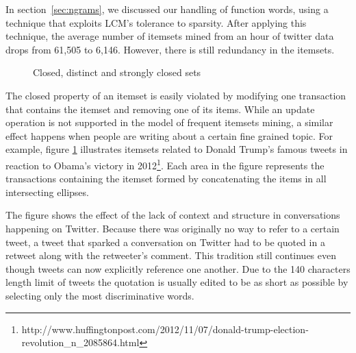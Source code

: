 \documentclass[letterpaper,12pt,titlepage,oneside,final]{book}
\begin{document}
In section~\ref{sec:ngrams}, we discussed our handling of function words,
using a technique that exploits LCM's tolerance to sparsity.
After applying this technique, the average number of itemsets mined from an
hour of twitter data drops from 61,505 to 6,146.
However, there is still redundancy in the itemsets.


\begin{figure}
\centering
{}
\caption{Closed, distinct and strongly closed sets}
\label{fig:sham}
\end{figure}


The closed property of an itemset is easily violated by modifying one
transaction that contains the itemset and removing one of its items.
While an update operation is not supported in the model of frequent itemsets
mining, a similar effect happens when people are writing about a certain fine
grained topic.
For example, figure \ref{fig:sham} illustrates  itemsets related to Donald
Trump's famous tweets in reaction to Obama's victory in
2012\footnote{http://www.huffingtonpost.com/2012/11/07/donald-trump-election-revolution\_n\_2085864.html}.  
Each area in the figure represents the transactions containing the itemset
formed by concatenating the items in all intersecting ellipses.  

The figure shows the effect of the lack of context and structure in
conversations happening on Twitter.
Because there was originally no way to refer to a certain tweet,
a tweet that sparked a conversation on Twitter had to be quoted in a retweet
along with the retweeter's comment.
This tradition still continues even though tweets can now explicitly reference
one another. 
Due to the 140 characters length limit of tweets the quotation is usually 
edited to be as short as possible by selecting only the most discriminative
words. 
\end{document}
